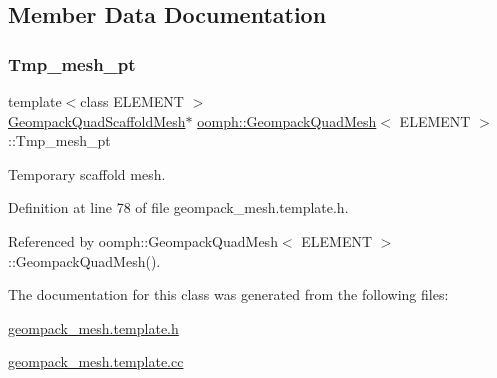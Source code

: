 \subsection{Member Data Documentation}
\mbox{\label{classoomph_1_1GeompackQuadMesh_a0b7edabf329aed8f4fb00eddb41b3299}} 
\subsubsection{\texorpdfstring{Tmp\+\_\+mesh\+\_\+pt}{Tmp\_mesh\_pt}}
{\footnotesize\ttfamily template$<$class E\+L\+E\+M\+E\+NT $>$ \\
\hyperlink{classoomph_1_1GeompackQuadScaffoldMesh}{Geompack\+Quad\+Scaffold\+Mesh}$\ast$ \hyperlink{classoomph_1_1GeompackQuadMesh}{oomph\+::\+Geompack\+Quad\+Mesh}$<$ E\+L\+E\+M\+E\+NT $>$\+::Tmp\+\_\+mesh\+\_\+pt\hspace{0.3cm}{\ttfamily [private]}}



Temporary scaffold mesh. 



Definition at line 78 of file geompack\+\_\+mesh.\+template.\+h.



Referenced by oomph\+::\+Geompack\+Quad\+Mesh$<$ E\+L\+E\+M\+E\+N\+T $>$\+::\+Geompack\+Quad\+Mesh().



The documentation for this class was generated from the following files\+:\begin{DoxyCompactItemize}
\item 
\hyperlink{geompack__mesh_8template_8h}{geompack\+\_\+mesh.\+template.\+h}\item 
\hyperlink{geompack__mesh_8template_8cc}{geompack\+\_\+mesh.\+template.\+cc}\end{DoxyCompactItemize}
